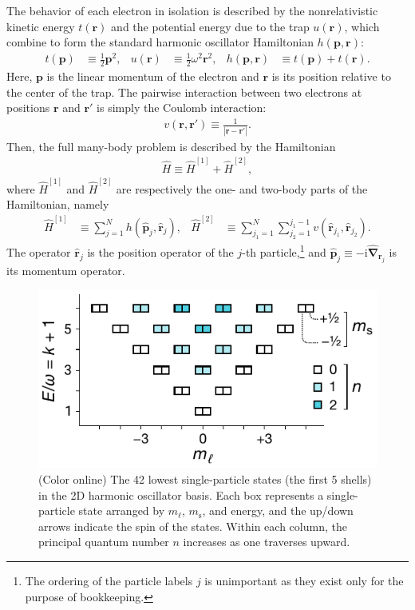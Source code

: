 The behavior of each electron in isolation is described by the nonrelativistic kinetic energy $t(\bm{r})$ and the potential energy due to the trap $u(\bm{r})$, which combine to form the standard harmonic oscillator Hamiltonian $h(\bm{p}, \bm{r})$:
\begin{align*}
  t(\bm{p}) &\equiv \frac{1}{2} \bm{p}^2, &
  u(\bm{r}) &\equiv \frac{1}{2} \omega^2 \bm{r}^2, &
  h(\bm{p}, \bm{r}) &\equiv t(\bm{p}) + t(\bm{r}).
\end{align*}
Here, $\bm{p}$ is the linear momentum of the electron and $\bm{r}$ is its position relative to the center of the trap.  The pairwise interaction between two electrons at positions $\bm{r}$ and $\bm{r}'$ is simply the Coulomb interaction:
\begin{align*}
  v(\bm{r}, \bm{r}') \equiv \frac{1}{|\bm{r} - \bm{r}'|}.
\end{align*}
Then, the full many-body problem is described by the Hamiltonian
\begin{align*}
  \hat H \equiv \hat H^{[1]} + \hat H^{[2]},
\end{align*}
where $\hat{H}^{[1]}$ and $\hat{H}^{[2]}$ are respectively the one- and two-body parts of the Hamiltonian, namely
\begin{align} \label{eq:onetwobodyhamiltonian}
\hat{H}^{[1]} &\equiv \sum_{j = 1}^N h(\hat{\bm p}_j, \hat{\bm r}_j), &
\hat{H}^{[2]} &\equiv \sum_{j_1 = 1}^N \sum_{j_2 = 1}^{j_1 - 1} v(\hat{\bm r}_{j_1}, \hat{\bm r}_{j_2}).
\end{align}
The operator $\hat{\bm r}_j$ is the position operator of the $j$-th particle,\footnote{The ordering of the particle labels $j$ is unimportant as they exist only for the purpose of bookkeeping.} and $\hat{\bm p}_j \equiv -\mathrm{i} \hat{\bm{\nabla}}_{\bm{r}_j}$ is its momentum operator.

\begin{figure}
  \includegraphics{figures/fig-shell-structure-v2.pdf}
  \caption{(Color online) The 42 lowest single-particle states (the first 5 shells) in the 2D harmonic oscillator basis.  Each box represents a single-particle state arranged by $m_\ell$, $m_{\mathrm{s}}$, and energy, and the up/down arrows indicate the spin of the states.  Within each column, the principal quantum number $n$ increases as one traverses upward.}
  \label{fig:shell-structure}
\end{figure}

